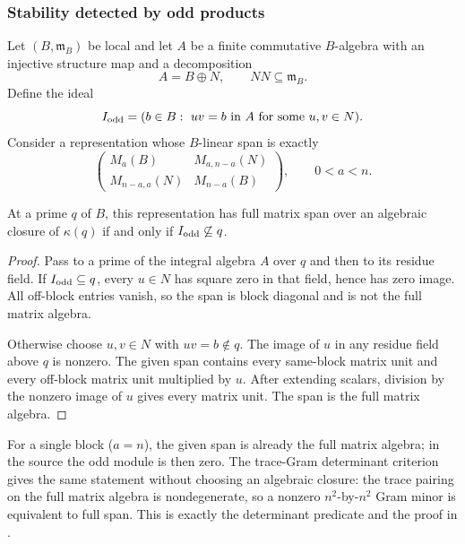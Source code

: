 \subsubsection{Stability detected by odd products}
Let $(B,\mathfrak m_B)$ be local and let $A$ be a finite commutative
$B$-algebra with an injective structure map and a decomposition
\[
                          A=B\oplus N,\qquad NN\subseteq\mathfrak m_B.
\]
Define the ideal
\[
  I_{\rm odd}=(b\in B:\ uv=b\text{ in }A
                              \text{ for some }u,v\in N).
\]
Consider a representation whose $B$-linear span is exactly
\[
 \begin{pmatrix}
 M_a(B)&M_{a,n-a}(N)\\
 M_{n-a,a}(N)&M_{n-a}(B)
 \end{pmatrix},\qquad0<a<n .
\]
\begin{srlemma}\label{lem:sr-odd-product-detector}
At a prime $q$ of $B$, this representation has full matrix span over
an algebraic closure of $\kappa(q)$ if and only if
$I_{\rm odd}\not\subseteq q$.
\end{srlemma}
\begin{proof}
Pass to a prime of the integral algebra $A$ over $q$ and then to its
residue field.
If $I_{\rm odd}\subseteq q$, every $u\in N$ has square zero in that
field, hence has zero image. All off-block entries vanish, so the span
is block diagonal and is not the full matrix algebra.

Otherwise choose $u,v\in N$ with $uv=b\notin q$.
The image of $u$ in any residue field above $q$ is nonzero.
The given span contains every same-block matrix unit and every
off-block matrix unit multiplied by $u$.
After extending scalars, division by the nonzero image of $u$ gives
every matrix unit. The span is the full matrix algebra.
\end{proof}
For a single block ($a=n$), the given span is already the full matrix
algebra; in the source the odd module is then zero.
The trace-Gram determinant criterion gives the same statement without
choosing an algebraic closure: the trace pairing on the full matrix
algebra is nondegenerate, so a nonzero $n^2$-by-$n^2$ Gram minor is
equivalent to full span. This is exactly the determinant predicate
 and the proof in .

